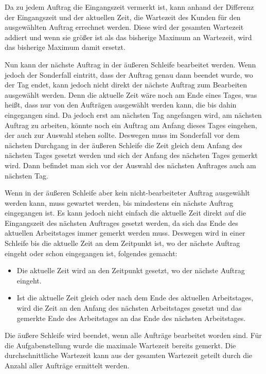 \documentclass[a4paper,10pt,ngerman]{scrartcl}
\begin{document}
Da zu jedem Auftrag die Eingangszeit vermerkt ist,
kann anhand der Differenz der Eingangszeit
und der aktuellen Zeit, die Wartezeit des Kunden für den ausgewählten Auftrag errechnet werden.
Diese wird der gesamten Wartezeit addiert
und wenn sie größer ist als das bisherige Maximum an Wartezeit,
wird das bisherige Maximum damit ersetzt.

Nun kann der nächste Auftrag in der äußeren Schleife bearbeitet werden.
Wenn jedoch der Sonderfall eintritt, dass der Auftrag genau dann beendet wurde,
wo der Tag endet,
kann jedoch nicht direkt
der nächste Auftrag zum Bearbeiten ausgewählt werden.
Denn die aktuelle Zeit wäre noch am Ende eines Tages,
was heißt, dass nur von den Aufträgen ausgewählt werden kann,
die bis dahin eingegangen sind.
Da jedoch erst am nächsten Tag angefangen wird,
am nächsten Auftrag zu arbeiten,
könnte noch ein Auftrag am Anfang dieses Tages eingehen, der auch zur Auswahl stehen sollte.
Deswegen muss im Sonderfall vor dem nächsten Durchgang in der äußeren Schleife
die Zeit gleich dem Anfang des nächsten Tages gesetzt werden 
und sich der Anfang des nächsten Tages gemerkt wird.
Dann befindet man sich vor der Auswahl des nächsten Auftrages auch am nächsten Tag.

Wenn in der äußeren Schleife aber kein nicht-bearbeiteter Auftrag ausgewählt werden kann,
muss gewartet werden, bis mindestens ein nächste Auftrag eingegangen ist.
Es kann jedoch nicht einfach die aktuelle Zeit direkt
auf die Eingangszeit des nächsten Auftrages gesetzt werden,
da sich das Ende des aktuellen Arbeitstages immer gemerkt werden muss.
Deswegen wird in einer Schleife
bis die aktuelle Zeit an dem Zeitpunkt ist,
wo der nächste Auftrag eingeht oder schon eingegangen ist, folgendes gemacht:
\begin{itemize}
\item Die aktuelle Zeit wird an den Zeitpunkt gesetzt,
wo der nächste Auftrag eingeht.
\item Ist die aktuelle Zeit gleich oder nach dem Ende des aktuellen Arbeitstages,
wird die Zeit an den Anfang des nächsten Arbeitstages gesetzt
und das gemerkte Ende des Arbeitstages an das Ende des nächsten Arbeitstages.
\end{itemize}

Die äußere Schleife wird beendet,
wenn alle Aufträge bearbeitet worden sind.
Für die Aufgabenstellung wurde die maximale Wartezeit bereits gemerkt.
Die durchschnittliche Wartezeit
kann aus der gesamten Wartezeit geteilt
durch die Anzahl aller Aufträge ermittelt werden.
\end{document}
